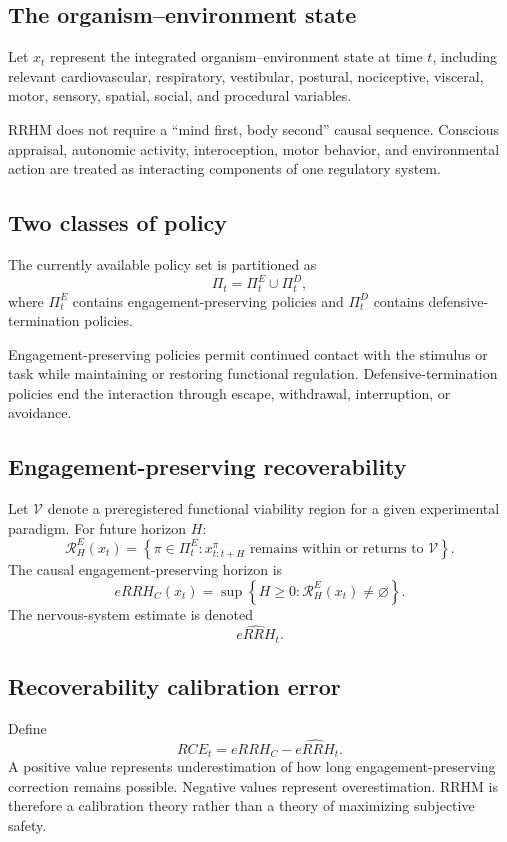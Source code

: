\documentclass[11pt]{article}
\begin{document}
\subsection{The organism--environment state}
Let $x_t$ represent the integrated organism--environment state at time $t$, including relevant cardiovascular, respiratory, vestibular, postural, nociceptive, visceral, motor, sensory, spatial, social, and procedural variables.

RRHM does not require a ``mind first, body second'' causal sequence. Conscious appraisal, autonomic activity, interoception, motor behavior, and environmental action are treated as interacting components of one regulatory system.

\subsection{Two classes of policy}
The currently available policy set is partitioned as
\[
\Pi_t=\Pi_t^{E}\cup\Pi_t^{D},
\]
where $\Pi_t^{E}$ contains engagement-preserving policies and $\Pi_t^{D}$ contains defensive-termination policies.

Engagement-preserving policies permit continued contact with the stimulus or task while maintaining or restoring functional regulation. Defensive-termination policies end the interaction through escape, withdrawal, interruption, or avoidance.

\subsection{Engagement-preserving recoverability}
Let $\mathcal V$ denote a preregistered functional viability region for a given experimental paradigm. For future horizon $H$:
\[
\mathcal R_H^{E}(x_t)=\left\{\pi\in\Pi_t^{E}:x_{t:t+H}^{\pi}\text{ remains within or returns to }\mathcal V\right\}.
\]
The causal engagement-preserving horizon is
\[
eRRH_C(x_t)=\sup\left\{H\ge0:\mathcal R_H^{E}(x_t)\neq\varnothing\right\}.
\]
The nervous-system estimate is denoted
\[
\widehat{eRRH}_t.
\]

\subsection{Recoverability calibration error}
Define
\[
RCE_t=eRRH_C-\widehat{eRRH}_t.
\]
A positive value represents underestimation of how long engagement-preserving correction remains possible. Negative values represent overestimation. RRHM is therefore a calibration theory rather than a theory of maximizing subjective safety.
\end{document}
